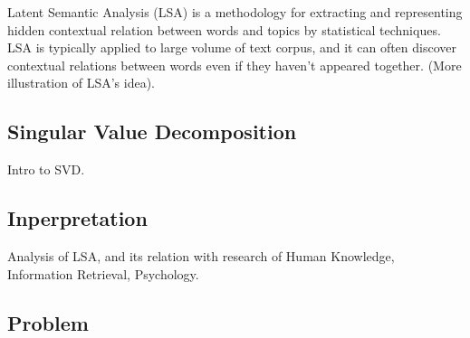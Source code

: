 Latent Semantic Analysis (LSA) is a methodology for extracting and representing hidden contextual relation between words and topics by statistical techniques\cite{landauer1998introduction}. LSA is typically applied to large volume of text corpus, and it can often discover contextual relations between words even if they haven't appeared together. (More illustration of LSA's idea). 

\subsection{Singular Value Decomposition}
Intro to SVD.

\subsection{Inperpretation}
Analysis of LSA, and its relation with research of Human Knowledge, Information Retrieval, Psychology.

\subsection{Problem}

